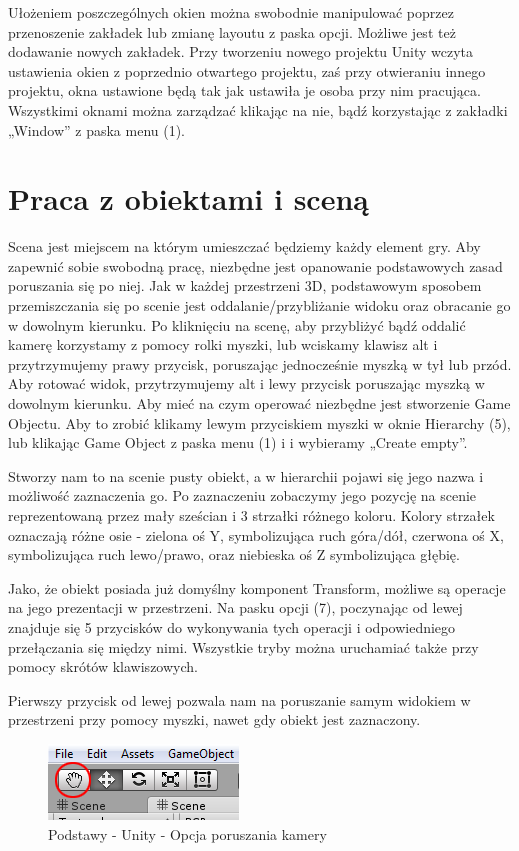 \documentclass[12pt]{xmgr}
\begin{document}
 Ułożeniem poszczególnych okien można swobodnie manipulować poprzez przenoszenie zakładek lub zmianę layoutu z paska opcji. Możliwe jest też dodawanie nowych zakładek. Przy tworzeniu nowego projektu Unity wczyta ustawienia okien z poprzednio otwartego projektu, zaś przy otwieraniu innego projektu, okna ustawione będą tak jak ustawiła je osoba przy nim pracująca. Wszystkimi oknami można zarządzać klikając na nie, bądź korzystając z zakładki „Window” z paska menu (1).
\newpage
\section{Praca z obiektami i sceną}

Scena jest miejscem na którym umieszczać będziemy każdy element gry. Aby zapewnić sobie swobodną pracę, niezbędne jest opanowanie podstawowych zasad poruszania się po niej. Jak w każdej przestrzeni 3D, podstawowym sposobem przemiszczania się po scenie jest oddalanie/przybliżanie widoku oraz obracanie go w dowolnym kierunku. Po kliknięciu na scenę, aby przybliżyć bądź oddalić kamerę korzystamy z pomocy rolki myszki, lub wciskamy klawisz alt i przytrzymujemy prawy przycisk, poruszając jednocześnie myszką w tył lub przód. Aby rotować widok, przytrzymujemy alt i lewy przycisk poruszając myszką w dowolnym kierunku. Aby mieć na czym operować niezbędne jest stworzenie Game Objectu. Aby to zrobić klikamy lewym przyciskiem myszki w oknie Hierarchy (5), lub klikając Game Object z paska menu (1) i i wybieramy „Create empty”.

Stworzy nam to na scenie pusty obiekt, a w hierarchii pojawi się jego nazwa i możliwość zaznaczenia go. Po zaznaczeniu zobaczymy jego pozycję na scenie reprezentowaną przez mały sześcian i 3 strzałki różnego koloru. Kolory strzałek oznaczają różne osie - zielona oś Y, symbolizująca ruch góra/dół, czerwona oś X, symbolizująca ruch lewo/prawo, oraz niebieska oś Z symbolizująca głębię.

Jako, że obiekt posiada już domyślny komponent Transform, możliwe są operacje na jego prezentacji w przestrzeni. Na pasku opcji (7), poczynając od lewej znajduje się 5 przycisków do wykonywania tych operacji i odpowiedniego przełączania się między nimi. Wszystkie tryby można uruchamiać także  przy pomocy skrótów klawiszowych.

Pierwszy przycisk od lewej pozwala nam na poruszanie samym widokiem w przestrzeni przy pomocy myszki, nawet gdy obiekt jest zaznaczony.

\begin{figure}[!htb]
    \begin{center}
    \includegraphics[scale=0.4]{Screeny/rodzial5screeny/drag_option}
    \end{center}
    \caption{Podstawy - Unity - Opcja poruszania kamery}
\end{figure}
\end{document}
